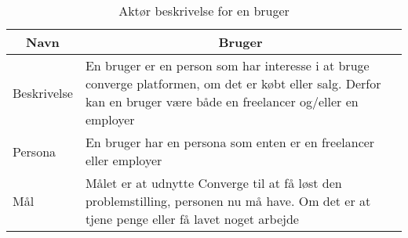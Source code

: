 \begin{table}[H]
    \begin{small}
        \caption{Aktør beskrivelse for en bruger}
        \label{tab:bruger}
        \begin{center}
            \begin{tabular}[c]{p{3cm}|p{8cm}}
                \multicolumn{1}{c|}{\textbf{Navn}} & \multicolumn{1}{c}{\textbf{Bruger}}                                                                                                                                                             \\
                \hline
                Beskrivelse                        & \multicolumn{1}{p{10cm}}{En bruger er en person som har interesse i at bruge converge platformen, om det er købt eller salg. Derfor kan en bruger være både en freelancer og/eller en employer} \\
                \hline
                Persona                            & \multicolumn{1}{p{10cm}}{En bruger har en persona som enten er en freelancer eller employer}                                                                                                 \\
                \hline
                Mål                                & \multicolumn{1}{p{10cm}}{Målet er at udnytte Converge til at få løst den problemstilling, personen nu må have. Om det er at tjene penge eller få lavet noget arbejde}                           \\
            \end{tabular}
        \end{center}
    \end{small}
\end{table}



